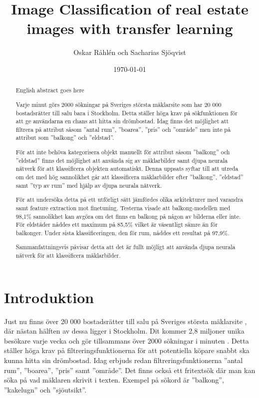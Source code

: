 \documentclass[]{kththesis}
\title{Image Classification of real estate images with transfer learning}
\author{Oskar Råhlén och Sacharias Sjöqvist}
\date{\today}
\begin{document}
\frontmatter
\titlepage

\begin{abstract}
    English abstract goes here
\end{abstract}

\begin{otherlanguage}{swedish}
  \begin{abstract}
    Varje minut görs 2000 sökningar på Sveriges största mäklarsite som har 20 000 bostadsrätter till salu bara i Stockholm.
    Detta ställer höga krav på sökfunktionen för att ge användarna en chans att hitta sin drömbostad. 
    Idag finns det möjlighet att filtrera på attribut såsom ”antal rum”, ”boarea”, ”pris” och ”område” men inte på attribut som ”balkong” och ”eldstad”.

    För att inte behöva kategorisera objekt manuellt för attribut såsom ”balkong” och ”eldstad” finns det möjlighet att använda sig av mäklarbilder samt djupa neurala nätverk för att klassificera objekten automatiskt.
    Denna uppsats syftar till att utreda om det med hög sannolikhet går att klassificera mäklarbilder efter ”balkong”, ”eldstad” samt ”typ av rum” med hjälp av djupa neurala nätverk.
    
    För att undersöka detta på ett utförligt sätt jämfördes olika arkitekturer med varandra samt feature extraction mot finetuning.
    Testerna visade att balkong-modellen med 98,1\% sannolikhet kan avgöra om det finns en balkong på någon av bilderna eller inte.
    För eldstäder nåddes ett maximum på 85,5\% vilket är väsentligt sämre än för balkonger.
    Under sista klassificeringen, den för rum, nåddes ett resultat på 97,9\%.

    Sammanfattningsvis påvisar detta att det är fullt möjligt att använda djupa neurala nätverk för att klassificera mäklarbilder. 
    

  \end{abstract}
\end{otherlanguage}
  
\tableofcontents

\mainmatter

\chapter{Introduktion}

Just nu finns över 20 000 bostadsrätter \parencite{hemnetstats} till salu på Sveriges största mäklarsite \parencite{hemnetom}, där nästan hälften av dessa ligger i Stockholm. 
Dit kommer 2,8 miljoner unika besökare varje vecka och gör tillsammans över 2000 sökningar i minuten \parencite{hemnetom}.
Detta ställer höga krav på filtreringsfunktionerna för att potentiella köpare snabbt ska kunna hitta sin drömbostad.
Idag erbjuds redan filtreringsfunktionerna ”antal rum”, ”boarea”, ”pris” samt ”område”. 
Det finns också ett fritextsök där man kan söka på vad mäklaren skrivit i texten.
Exempel på sökord är ”balkong”, ”kakelugn” och ”sjöutsikt”. 
\end{document}
